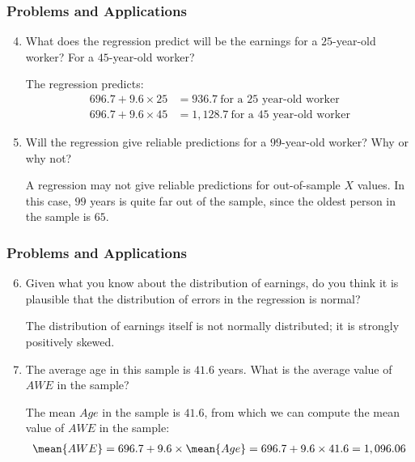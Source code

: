 \begin{frame}
\frametitle{Problems and Applications}
\ask

\begin{enumerate}\setcounter{enumi}{3}

\item What does the regression predict will be the earnings for a $25$-year-old worker? For a $45$-year-old worker?

\begin{answer}
The regression predicts:
\begin{align*}
696.7 + 9.6 \times 25 & = 936.7 ~\text{for a $25$ year-old worker}\\ 
696.7 + 9.6 \times 45 & = 1,128.7 ~\text{for a $45$ year-old worker}
\end{align*}
\end{answer}

\item Will the regression give reliable predictions for a $99$-year-old worker? Why or why not?

\begin{answer}
A regression may not give reliable predictions for out-of-sample $X$ values. In this case, $99$ years is quite far out of the sample, since the oldest person in the sample is $65$.
\end{answer}

\end{enumerate}
\end{frame}


\begin{frame}
\frametitle{Problems and Applications}
\ask

\begin{enumerate}\setcounter{enumi}{5}

\item Given what you know about the distribution of earnings, do you think it is plausible that the distribution of errors in the regression is normal? 

\begin{answer}
The distribution of earnings itself is not normally distributed; it is strongly positively skewed. 
\end{answer}

\item The average age in this sample is $41.6$ years. What is the average value of $AWE$ in the sample?

\begin{answer}
The mean $Age$ in the sample is $41.6$, from which we can compute the mean value of $AWE$ in the sample: 
\begin{align*}
\mean{AWE} 
    = 696.7 + 9.6 \times \mean{Age}
    = 696.7 + 9.6 \times 41.6 
    = 1,096.06
\end{align*}
\end{answer}

\end{enumerate}
\end{frame}


